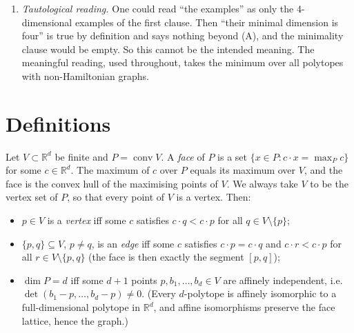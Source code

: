 \documentclass[11pt]{article}
\theoremstyle{definition}
\theoremstyle{remark}
\begin{document}
\begin{enumerate}
still fails in dimension $3$. The cuboctahedron, the convex hull of all
permutations of $(\pm1,\pm1,0)$, is the polar dual of
the rhombic dodecahedron $R$ of Section~4. Its $8$ triangles and $6$ squares are its
facets, and every edge lies on one triangle and one square. Its facet-adjacency
graph is therefore the graph of $R$, which is not Hamiltonian
(Theorem~\ref{thm:main}). \texttt{verify.py} computes this dual graph directly and
checks that it is not Hamiltonian.
\item \emph{Tautological reading.} One could read ``the examples'' as only the
4-dimensional examples of the first clause. Then ``their minimal dimension is
four'' is true by definition and says nothing beyond (A), and the minimality clause
would be empty. So this cannot be the intended meaning. The meaningful reading, used
throughout, takes the minimum over all polytopes with non-Hamiltonian graphs.
\end{enumerate}

\section{Definitions}\label{sec:defs}
Let $V\subset\mathbb{R}^d$ be finite and $P=\operatorname{conv}V$. A
\emph{face} of $P$ is a set $\{x\in P: c\cdot x=\max_P c\}$ for some
$c\in\mathbb{R}^d$. The maximum of $c$ over $P$ equals its maximum over $V$, and the
face is the convex hull of the maximising points of $V$. We always take $V$ to be
the vertex set of $P$, so that every point of $V$ is a vertex. Then:
\begin{itemize}
\item $p\in V$ is a \emph{vertex} iff some $c$ satisfies $c\cdot q<c\cdot p$ for
all $q\in V\setminus\{p\}$;
\item $\{p,q\}\subseteq V$, $p\neq q$, is an \emph{edge} iff some $c$ satisfies
$c\cdot p=c\cdot q$ and $c\cdot r<c\cdot p$ for all $r\in V\setminus\{p,q\}$
(the face is then exactly the segment $[p,q]$);
\item $\dim P=d$ iff some $d+1$ points $p,b_1,\dots,b_d\in V$ are affinely
independent, i.e. $\det(b_1-p,\dots,b_d-p)\neq0$. (Every $d$-polytope is
affinely isomorphic to a full-dimensional polytope in $\mathbb{R}^d$, and affine
isomorphisms preserve the face lattice, hence the graph.)
\end{itemize}
\end{document}
